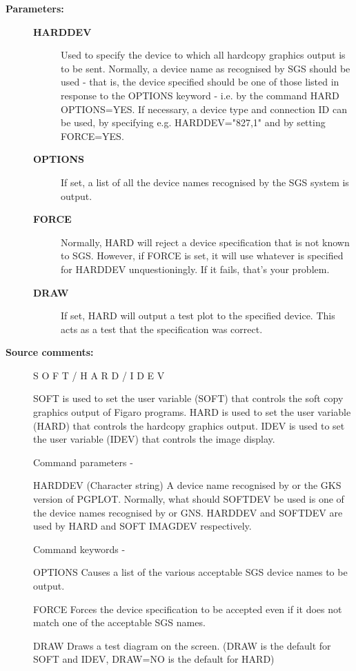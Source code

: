 \begin{description}
\begin{description}
\item [\textbf{Parameters:}]
\begin{description}
\item [\textbf{HARDDEV}]
 Used to specify the device to which all hardcopy graphics
 output is to be sent.  Normally, a device name as
 recognised by SGS should be used - that is, the device
 specified should be one of those listed in response to the
 OPTIONS keyword - i.e. by the command HARD OPTIONS=YES. If
 necessary, a device type and connection ID can be used, by
 specifying e.g. HARDDEV="827,1" and by setting FORCE=YES.
\item [\textbf{OPTIONS}]
 If set, a list of all the device names recognised by
 the SGS system is output.
\item [\textbf{FORCE}]
 Normally, HARD will reject a device specification that is
 not known to SGS.  However, if FORCE is set, it will use
 whatever is specified for HARDDEV unquestioningly.  If it
 fails, that's your problem.
\item [\textbf{DRAW}]
 If set, HARD will output a test plot to the specified
 device.  This acts as a test that the specification was
 correct.
\end{description}

\item [\textbf{Source comments:}]
\begin{terminalv}
 S O F T  /  H A R D  /  I D E V

 SOFT is used to set the user variable (SOFT) that controls
 the soft copy graphics output of Figaro programs.  HARD is
 used to set the user variable (HARD) that controls the
 hardcopy graphics output. IDEV is used to set the user variable
 (IDEV) that controls the image display.

 Command parameters -

 HARDDEV  (Character string) A device name recognised by
   or     the GKS version of PGPLOT.  Normally, what should
 SOFTDEV  be used is one of the device names recognised by
   or     GNS.  HARDDEV and SOFTDEV are used by HARD and SOFT
 IMAGDEV  respectively.

 Command keywords -

 OPTIONS  Causes a list of the various acceptable SGS device
          names to be output.

 FORCE    Forces the device specification to be accepted even
          if it does not match one of the acceptable SGS names.

 DRAW     Draws a test diagram on the screen.  (DRAW is the
          default for SOFT and IDEV, DRAW=NO is the default for
          HARD)


\end{terminalv}
\end{description}
\end{description}
